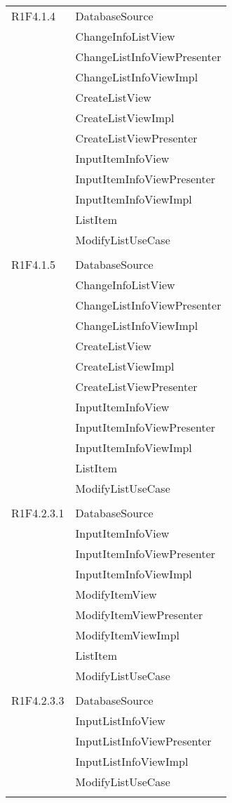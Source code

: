 \begin{center}
\begin{longtable}{|p{7cm}|p{5cm}|}
		R1F4.1.4 & DatabaseSource \\ & ChangeInfoListView \\ & ChangeListInfoViewPresenter \\ & ChangeListInfoViewImpl \\ & CreateListView \\ & CreateListViewImpl \\ & CreateListViewPresenter \\ & InputItemInfoView \\ & InputItemInfoViewPresenter \\ & InputItemInfoViewImpl \\ & ListItem \\ & ModifyListUseCase \\ & \\ \hline
		R1F4.1.5 & DatabaseSource \\ & ChangeInfoListView \\ & ChangeListInfoViewPresenter \\ & ChangeListInfoViewImpl \\ & CreateListView \\ & CreateListViewImpl \\ & CreateListViewPresenter \\ & InputItemInfoView \\ & InputItemInfoViewPresenter \\ & InputItemInfoViewImpl \\ & ListItem \\ & ModifyListUseCase \\ & \\ \hline
		R1F4.2.3.1 & DatabaseSource \\ & InputItemInfoView \\ & InputItemInfoViewPresenter \\ & InputItemInfoViewImpl \\ & ModifyItemView \\ & ModifyItemViewPresenter \\ & ModifyItemViewImpl \\ & ListItem \\ & ModifyListUseCase \\ & \\ \hline
		R1F4.2.3.3 & DatabaseSource \\ & InputListInfoView \\ & InputListInfoViewPresenter \\ & InputListInfoViewImpl \\ & ModifyListUseCase \\ & \\ \hline

\end{longtable}
\end{center}
